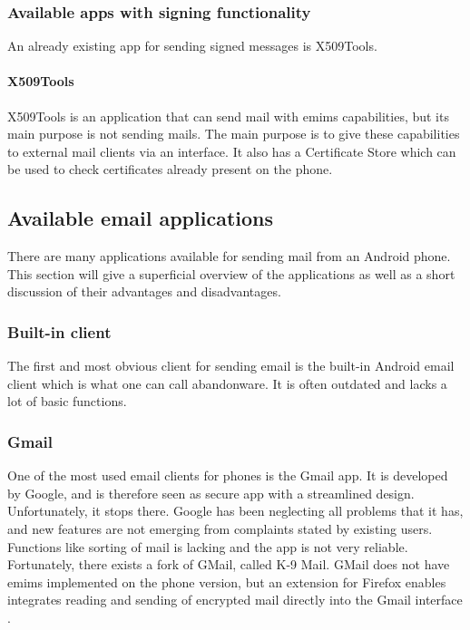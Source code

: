 \subsubsection{Available apps with signing functionality}
An already existing app for sending signed messages is X509Tools.

\paragraph{X509Tools} \hfill
\newline
X509Tools is an application that can send mail with \gls{emims} capabilities, but its main purpose is not sending mails. The main purpose is to give these capabilities to external mail clients via an interface. It also has a Certificate Store which can be used to check certificates already present on the phone. 

\subsection{Available email applications}
There are many applications available for sending mail from an Android phone. This section will give a superficial overview of the applications as well as a short discussion of their advantages and disadvantages.

\subsubsection{Built-in client}
The first and most obvious client for sending email is the built-in Android email client which is what one can call abandonware. It is often outdated and lacks a lot of basic functions.

\subsubsection{Gmail}
One of the most used email clients for phones is the Gmail app. It is developed by Google, and is therefore seen as secure app with a streamlined design. Unfortunately, it stops there. Google has been neglecting all problems that it has, and new features are not emerging from complaints stated by existing users. Functions like sorting of mail is lacking and the app is not very reliable. Fortunately, there exists a fork of GMail, called K-9 Mail. GMail does not have \gls{emims} implemented on the phone version, but an extension for Firefox enables integrates reading and sending of encrypted mail directly into the Gmail interface \cite{bib:gmail}.

